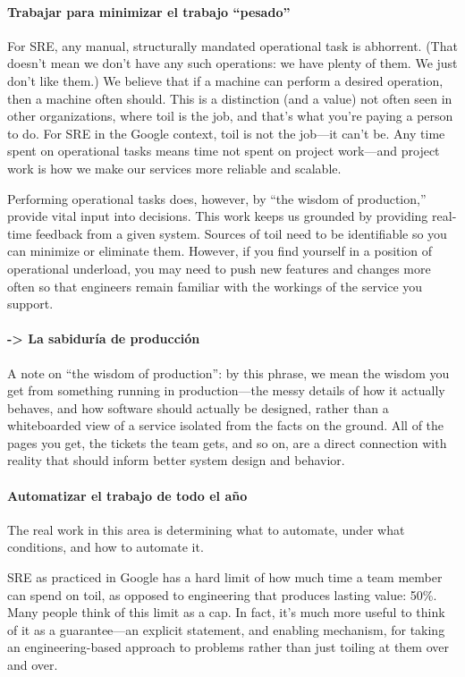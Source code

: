 \paragraph{Trabajar para minimizar el trabajo “pesado”}

For SRE, any manual, structurally mandated operational task is abhorrent. (That doesn’t mean we don’t have any such operations: we have plenty of them. We just don’t like them.) We believe that if a machine can perform a desired operation, then a machine often should. This is a distinction (and a value) not often seen in other organizations, where toil is the job, and that’s what you’re paying a person to do. For SRE in the Google context, toil is not the job—it can’t be. Any time spent on operational tasks means time not spent on project work—and project work is how we make our services more reliable and scalable.

Performing operational tasks does, however, by “the wisdom of production,” provide vital input into decisions. This work keeps us grounded by providing real-time feedback from a given system. Sources of toil need to be identifiable so you can minimize or eliminate them. However, if you find yourself in a position of operational underload, you may need to push new features and changes more often so that engineers remain familiar with the workings of the service you support.

\paragraph{-> La sabiduría de producción}

A note on “the wisdom of production”: by this phrase, we mean the wisdom you get from something running in production—the messy details of how it actually behaves, and how software should actually be designed, rather than a whiteboarded view of a service isolated from the facts on the ground. All of the pages you get, the tickets the team gets, and so on, are a direct connection with reality that should inform better system design and behavior.

\paragraph{Automatizar el trabajo de todo el año}

The real work in this area is determining what to automate, under what conditions, and how to automate it.

SRE as practiced in Google has a hard limit of how much time a team member can spend on toil, as opposed to engineering that produces lasting value: 50\%. Many people think of this limit as a cap. In fact, it’s much more useful to think of it as a guarantee—an explicit statement, and enabling mechanism, for taking an engineering-based approach to problems rather than just toiling at them over and over.

